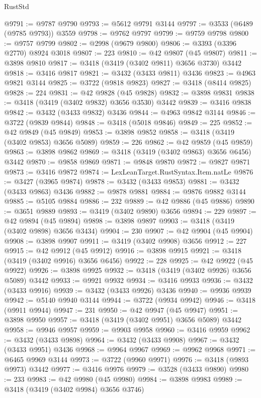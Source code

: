 \begin{lexlean}{RustStd}
\begin{coremodule}
@9791 := @9787 @9790
@9793 := @5612 @9791 @3144
@9797 := @3533 (@6489 (@9785 @9793)) @3559
@9798 := @9762 @9797
@9799 := @9759 @9798
@9800 := @9757 @9799
@9802 := @2998 (@9679 @9800)
@9806 := @3393 (@3396 @2770) @8924 @3018
@9807 := 223
@9810 := @42 @9807 (@45 @9807)
@9811 := @3898 @9810
@9817 := @3418 (@3419 (@3402 @9811) @3656 @3730) @3442
@9818 := @3416 @9817
@9821 := @3432 (@3433 @9811) @3436
@9823 := @4963 @9821 @3144
@9825 := @3722 (@9818 @9823)
@9827 := @3418 (@8414 @9825)
@9828 := 224
@9831 := @42 @9828 (@45 @9828)
@9832 := @3898 @9831
@9838 := @3418 (@3419 (@3402 @9832) @3656 @3530) @3442
@9839 := @3416 @9838
@9842 := @3432 (@3433 @9832) @3436
@9844 := @4963 @9842 @3144
@9846 := @3722 (@9839 @9844)
@9848 := @3418 (@5018 @9846)
@9849 := 225
@9852 := @42 @9849 (@45 @9849)
@9853 := @3898 @9852
@9858 := @3418 (@3419 (@3402 @9853) @3656 @5089)
@9859 := 226
@9862 := @42 @9859 (@45 @9859)
@9863 := @3898 @9862
@9869 := @3418 (@3419 (@3402 @9863) @3656 @6456) @3442
@9870 := @9858 @9869
@9871 := @9848 @9870
@9872 := @9827 @9871
@9873 := @3416 @9872
@9874 := LexLeanTarget.RustSyntax.Item.natLe
@9876 := @3427 (@3965 @9874)
@9878 := @3432 (@3433 @9853)
@9881 := @3432 (@3433 @9863) @3436
@9882 := @9878 @9881
@9884 := @9876 @9882 @3144
@9885 := @5105 @9884
@9886 := 232
@9889 := @42 @9886 (@45 @9886)
@9890 := @3651 @9889
@9893 := @3419 (@3402 @9890) @3656
@9894 := 229
@9897 := @42 @9894 (@45 @9894)
@9898 := @3898 @9897
@9903 := @3418 (@3419 (@3402 @9898) @3656 @3434)
@9904 := 230
@9907 := @42 @9904 (@45 @9904)
@9908 := @3898 @9907
@9911 := @3419 (@3402 @9908) @3656
@9912 := 227
@9915 := @42 @9912 (@45 @9912)
@9916 := @3898 @9915
@9921 := @3418 (@3419 (@3402 @9916) @3656 @6456)
@9922 := 228
@9925 := @42 @9922 (@45 @9922)
@9926 := @3898 @9925
@9932 := @3418 (@3419 (@3402 @9926) @3656 @5089) @3442
@9933 := @9921 @9932
@9934 := @3416 @9933
@9936 := @3432 (@3433 @9916)
@9939 := @3432 (@3433 @9926) @3436
@9940 := @9936 @9939
@9942 := @5140 @9940 @3144
@9944 := @3722 (@9934 @9942)
@9946 := @3418 (@9911 @9944)
@9947 := 231
@9950 := @42 @9947 (@45 @9947)
@9951 := @3898 @9950
@9957 := @3418 (@3419 (@3402 @9951) @3656 @5089) @3442
@9958 := @9946 @9957
@9959 := @9903 @9958
@9960 := @3416 @9959
@9962 := @3432 (@3433 @9898)
@9964 := @3432 (@3433 @9908)
@9967 := @3432 (@3433 @9951) @3436
@9968 := @9964 @9967
@9969 := @9962 @9968
@9971 := @6465 @9969 @3144
@9973 := @3722 (@9960 @9971)
@9976 := @3418 (@9893 @9973) @3442
@9977 := @3416 @9976
@9979 := @3528 (@3433 @9890)
@9980 := 233
@9983 := @42 @9980 (@45 @9980)
@9984 := @3898 @9983
@9989 := @3418 (@3419 (@3402 @9984) @3656 @3746)

\end{coremodule}
\end{lexlean}
